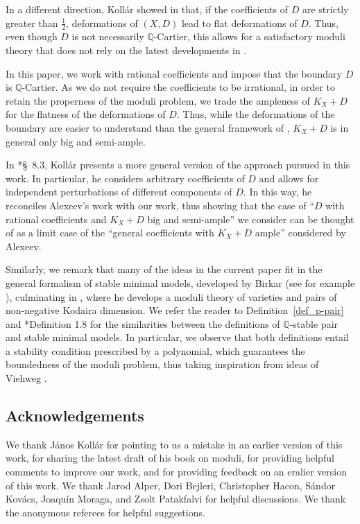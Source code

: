 \documentclass{amsart}
\newcommand{\bQ}{\mathbb{Q}}
\theoremstyle{definition}
\begin{document}
In a different direction, Koll\'ar showed in \cite{Kol14} that, if the coefficients of $D$ are strictly greater than $\frac{1}{2}$, deformations of $(X,D)$ lead to flat deformations of $D$.
Thus, even though $D$ is not necessarily $\mathbb Q$-Cartier, this allows for a satisfactory moduli theory that does not rely on the latest developments in \cite{kol19s}.

In this paper, we work with rational coefficients and impose that the boundary $D$ is $\mathbb Q$-Cartier.
As we do not require the coefficients to be irrational, in order to retain the properness of the moduli problem, we trade the ampleness of $K_X+D$ for the flatness of the deformations of $D$.
Thus, while the deformations of the boundary are easier to understand than the general framework of \cite{kol19s}, $K_X+D$ is in general only big and semi-ample.

In \cite{kol_new}*{\S~8.3}, Koll\'ar presents a more general version of the approach pursued in this work.
In particular, he considers arbitrary coefficients of $D$ and allows for independent perturbations of different components of $D$.
In this way, he reconciles Alexeev's work with our work, thus showing that the case of ``$D$ with rational coefficients and $K_X+D$ big and semi-ample'' we consider can be thought of as a limit case of the ``general coefficients with $K_X+D$ ample'' considered by Alexeev.

Similarly, we remark that many of the ideas in the current paper fit in the general formalism of stable minimal models, developed by Birkar (see for example \cite{birkar2021boundedness}), culminating in \cite{birkar2022moduli}, where he develops a moduli theory of varieties and pairs of non-negative Kodaira dimension.
We refer the reader to Definition~\ref{def_p-pair} and \cite{birkar2021boundedness}*{Definition 1.8} for the similarities between the definitions of $\bQ$-stable pair and stable minimal models.
In particular, we observe that both definitions entail a stability condition prescribed by a polynomial, which guarantees the boundedness of the moduli problem, thus taking inspiration from ideas of Viehweg \cite{Vie95}.


\subsection*{Acknowledgements} 
We thank J\'anos Koll\'ar for pointing to us a mistake in an earlier version of this work, for sharing the latest draft of his book on moduli, for providing helpful comments to improve our work, and for providing feedback on an eralier version of this work.
We thank Jarod Alper, Dori Bejleri, Christopher Hacon, S\'andor Kov\'acs, Joaqu\'in Moraga, and Zsolt Patakfalvi for helpful discussions.
We thank the anonymous referees for helpful suggestions.
\end{document}
